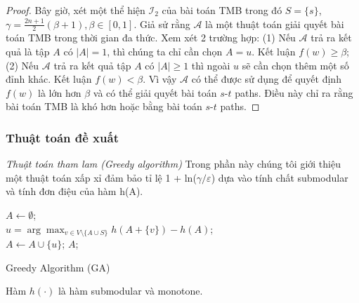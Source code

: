 \begin{proof}
	Bây giờ, xét một thể hiện $\mathcal{I}_2$ của bài toán TMB trong đó $S=\{s\}$, $\gamma = \frac{2n+1}{2}(\beta+ 1) , \beta \in [0, 1]$.  Giả sử rằng $\mathcal{A}$ là một thuật toán giải quyết bài toán TMB trong thời gian đa thức. Xem xét 2 trường hợp: (1) Nếu $\mathcal{A}$ trả ra kết quả là tập $A$ có $|A|=1$, thì chúng ta chỉ cần chọn $A={u}$. Kết luận $f(w) \geq \beta$; (2) Nếu $\mathcal{A}$ trả ra kết quả tập $A$ có $|A| \ge 1$ thì ngoài $u$ sẽ cần chọn thêm một số đỉnh khác. Kết luận $f(w) < \beta$. Vì vậy $\mathcal{A}$ có thể được sử dụng để quyết định $f(w)$ là lớn hơn $\beta$ và có thể giải quyết bài toán $s$-$t$ paths. Điều này chỉ ra rằng bài toán TMB là khó hơn hoặc bằng bài toán $s$-$t$ paths.
\end{proof}
\subsubsection{Thuật toán đề xuất}
{\itshape Thuật toán tham lam (Greedy algorithm)}
Trong phần này chúng tôi giới thiệu một thuật toán xấp xỉ đảm bảo tỉ lệ 1 + ln($\gamma / \varepsilon$) dựa vào tính chất submodular và tính đơn điệu của hàm h(A). 		
\\
\begin{algorithm}[tbh]			
	$A \leftarrow \emptyset$;
	\\
	{ 	
		$u=\arg \max_{v \in V\setminus \{A \cup S\}} {h(A+ \{v\})- h(A)}$; 
		\\
		$A \leftarrow A \cup \{u\}$;
	}
	\Return $A$;
	\caption{Greedy Algorithm (GA)}
	\label{GA}
\end{algorithm}

\begin{theo}					
	Hàm $h(\cdot)$ là hàm submodular và monotone. 
	\label{sub}
\end{theo}	

